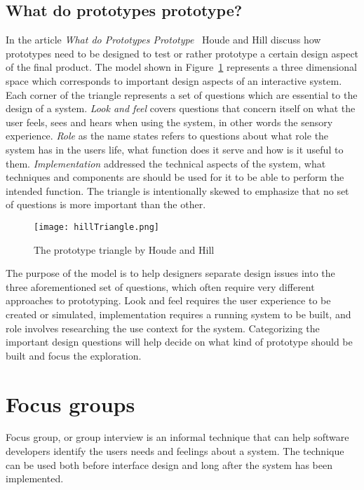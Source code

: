 \subsection{What do prototypes prototype?}
\label{sec:prototypesPrototype}
In the article \textit{What do Prototypes Prototype}~\cite{prototypesPrototype} Houde and Hill discuss how prototypes need to be designed to test or rather prototype a certain design aspect of the final product. The model shown in Figure~\ref{fig:hillTriangle} represents a three dimensional space which corresponds to important design aspects of an interactive system. Each corner of the triangle represents a set of questions which are essential to the design of a system. \textit{Look and feel} covers questions that concern itself on what the user feels, sees and hears when using the system, in other words the sensory experience. \textit{Role} as the name states refers to questions about what role the system has in the users life, what function does it serve and how is it useful to them. \textit{Implementation} addressed the technical aspects of the system, what techniques and components are should be used for it to be able to perform the intended function. The triangle is intentionally skewed to emphasize that no set of questions is more important than the other.

\begin{figure}[h!]
	\centering
		\texttt{[image: hillTriangle.png]}
		\caption{\footnotesize The prototype triangle by Houde and Hill~\cite{prototypesPrototype}}
		\label{fig:hillTriangle}
\end{figure}

The purpose of the model is to help designers separate design issues into the three aforementioned set of questions, which often require very different approaches to prototyping. Look and feel requires the user experience to be created or simulated, implementation requires a running system to be built, and role involves researching the use context for the system. Categorizing the important design questions will help decide on what kind of prototype should be built and focus the exploration.

\section{Focus groups}
\label{sec:focusGroup}
Focus group, or group interview is an informal technique that can help software developers identify the users needs and feelings about a system. The technique can be used both before interface design and long after the system has been implemented. 

